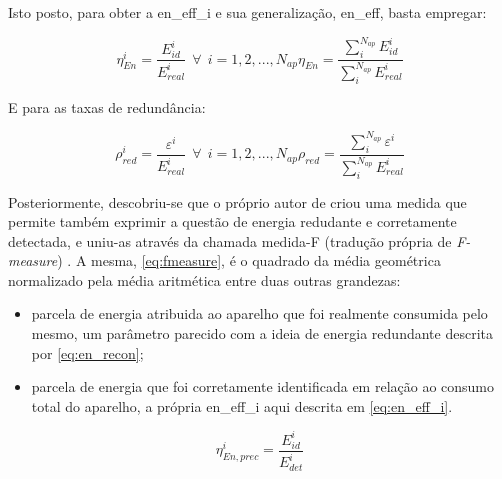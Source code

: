 Isto posto, para obter a \gls{en_eff_i} e sua generalização,
\gls{en_eff}, basta empregar:

\begin{subequations}
\begin{equation}\label{eq:en_eff_i}
\eta_{En}^i = \frac{E_{id}^i}{E_{real}^i} ~~ \forall ~~ i =
1,2,...,N_{ap}
\end{equation}
\begin{equation}\label{eq:en_eff}
\eta_{En} = \frac{\sum_{i}^{N_{ap}}E_{id}^i}{\sum_{i}^{N_{ap}}E_{real}^i}
\end{equation}
\end{subequations}

E para as taxas de redundância:

\begin{subequations}
\begin{equation}\label{eq:p_red_i}
\rho_{red}^i = \frac{\varepsilon^i}{E_{real}^i} ~~ \forall ~~ i =
1,2,...,N_{ap}
\end{equation}
\begin{equation}\label{eq:p_red}
\rho_{red} = \frac{\sum_{i}^{N_{ap}}\varepsilon^i}{\sum_{i}^{N_{ap}}E_{real}^i}
\end{equation}
\end{subequations}

Posteriormente, descobriu-se que o próprio autor de
\cite{nilm_zeifman_review_2011} criou uma medida que permite também
exprimir a questão de energia redudante e corretamente detectada, e
uniu-as através da chamada medida-F (tradução própria de
\emph{F-measure}) \cite{nilm_zeifman_statistical_approach_2012}. A
mesma, \ref{eq:fmeasure}, é o quadrado da média geométrica normalizado
pela média aritmética entre duas outras grandezas: 

\begin{itemize}
\item parcela de energia atribuida ao aparelho que foi realmente
consumida pelo mesmo, um parâmetro parecido com a ideia de energia
redundante descrita por \ref{eq:en_recon};
\item parcela de energia que foi corretamente identificada em relação
ao consumo total do aparelho, a própria \gls{en_eff_i} aqui descrita
em \ref{eq:en_eff_i}.
\end{itemize}

\begin{equation}\label{eq:en_recon}
\eta_{En,prec}^i = \frac{E_{id}^i}{E_{det}^i}
\end{equation}

